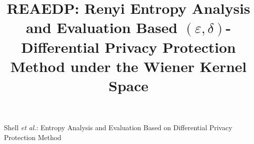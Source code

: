 \documentclass[journal,transmag]{IEEEtran}
\begin{document}
%



\title{REAEDP: Renyi Entropy Analysis and Evaluation Based $(\varepsilon , \delta )$-Differential Privacy Protection Method under the Wiener Kernel Space}

%
{Shell \MakeLowercase{\textit{et al.}}: Entropy Analysis and Evaluation Based on Differential Privacy Protection Method }
\end{document}
